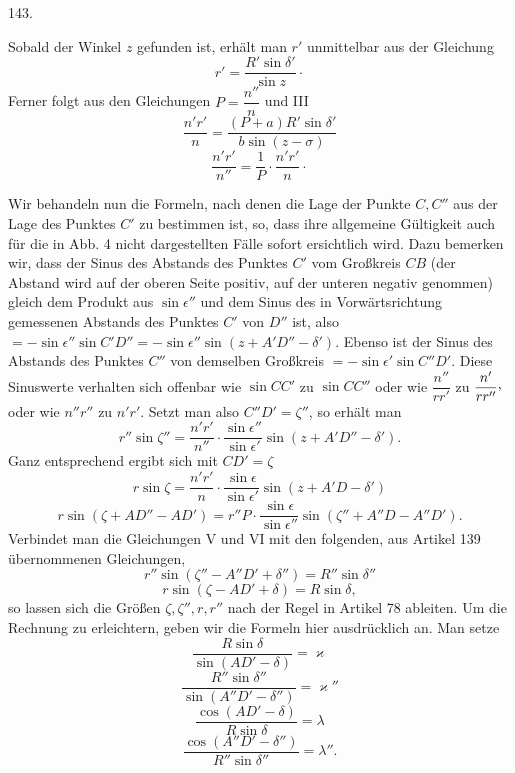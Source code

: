 \par{}\medskip
\begin{center}\hypertarget{native-192-article143}{}143.\end{center}
Sobald der Winkel $z$ gefunden ist, erhält man $r'$ unmittelbar aus der Gleichung
\[
r'=\frac{R'\sin\delta'}{\sin z}\mathpunct{\cdot}
\]
Ferner folgt aus den Gleichungen $P=\dfrac{n''}{n}$ und III
\[
\frac{n'r'}{n}=\frac{(P+a)R'\sin\delta'}{b\sin(z-\sigma)}
\]
\[
\frac{n'r'}{n''}=\frac{1}{P}\cdot\frac{n'r'}{n}\mathpunct{\cdot}
\]

Wir behandeln nun die Formeln, nach denen die Lage der Punkte $C,C''$ aus der Lage des Punktes $C'$ zu bestimmen ist, so, dass ihre allgemeine Gültigkeit auch für die in Abb. 4 nicht dargestellten Fälle sofort ersichtlich wird. Dazu bemerken wir, dass der Sinus des Abstands des Punktes $C'$ vom Großkreis $CB$ (der Abstand wird auf der oberen Seite positiv, auf der unteren negativ genommen) gleich dem Produkt aus $\sin\epsilon''$ und dem Sinus des in Vorwärtsrichtung gemessenen Abstands des Punktes $C'$ von $D''$ ist, also $=-\sin\epsilon''\sin C'D''=-\sin\epsilon''\sin(z+A'D''-\delta')$. Ebenso ist der Sinus des Abstands des Punktes $C''$ von demselben Großkreis $=-\sin\epsilon'\sin C''D'$. Diese Sinuswerte verhalten sich offenbar wie $\sin CC'$ zu $\sin CC''$ oder wie $\dfrac{n''}{rr'}$ zu $\dfrac{n'}{rr''}\mathpunct{\raisebox{.45ex}{,}}$ oder wie $n''r''$ zu $n'r'$. Setzt man also $C''D'=\zeta''$, so erhält man
\[
\tag*{V.}r''\sin\zeta''=\frac{n'r'}{n''}\cdot\frac{\sin\epsilon''}{\sin\epsilon'}\sin(z+A'D''-\delta').
\]
Ganz entsprechend ergibt sich mit $CD'=\zeta$
\[
\tag*{VI.}r\sin\zeta=\frac{n'r'}{n}\cdot\frac{\sin\epsilon}{\sin\epsilon'}\sin(z+A'D-\delta')
\]
\[
\tag*{VII.}r\sin(\zeta+AD''-AD')=r''P\cdot\frac{\sin\epsilon}{\sin\epsilon''}\sin(\zeta''+A''D-A''D').
\]
Verbindet man die Gleichungen V und VI mit den folgenden, aus Artikel 139 übernommenen Gleichungen,
\[
\tag*{VIII.}r''\sin(\zeta''-A''D'+\delta'')=R''\sin\delta''
\]
\[
\tag*{IX.}r\sin(\zeta-AD'+\delta)=R\sin\delta,
\]
so lassen sich die Größen $\zeta,\zeta'',r,r''$ nach der Regel in Artikel 78 ableiten. Um die Rechnung zu erleichtern, geben wir die Formeln hier ausdrücklich an. Man setze
\[
\tag*{17)}\frac{R\sin\delta}{\sin(AD'-\delta)}=\varkappa
\]
\[
\tag*{18)}\frac{R''\sin\delta''}{\sin(A''D'-\delta'')}=\varkappa''
\]
\[
\tag*{19)}\frac{\cos(AD'-\delta)}{R\sin\delta}=\lambda
\]
\[
\tag*{20)}\frac{\cos(A''D'-\delta'')}{R''\sin\delta''}=\lambda''.
\]
